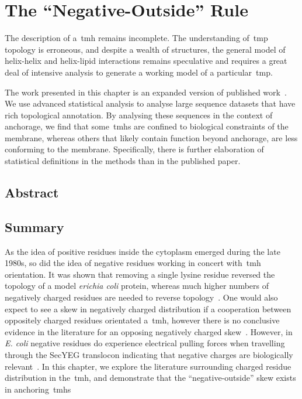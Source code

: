 
\chapter{The ``Negative-Outside'' Rule}
\sloppy
The description of a~\gls{tmh} remains incomplete.
The understanding of~\gls{tmp} topology is erroneous, and despite a wealth of structures, the general model of helix-helix and helix-lipid interactions remains speculative and requires a great deal of intensive analysis to generate a working model of a particular~\gls{tmp}.

The work presented in this chapter is an expanded version of published work~\cite{Baker2017}.
We use advanced statistical analysis to analyse large sequence datasets that have rich topological annotation.
By analysing these sequences in the context of anchorage, we find that some~\gls{tmh}s are confined to biological constraints of the membrane, whereas others that likely contain function beyond anchorage, are less conforming to the membrane.
Specifically, there is further elaboration of statistical definitions in the methods than in the published paper.

\section{Abstract}

\section{Summary}
As the idea of positive residues inside the cytoplasm emerged during the late 1980s, so did the idea of negative residues working in concert with~\gls{tmh} orientation.
It was shown that removing a single lysine residue reversed the topology of a model \textit{erichia coli} protein, whereas much higher numbers of negatively charged residues are needed to reverse topology~\cite{Nilsson1990}.
One would also expect to see a skew in negatively charged distribution if a cooperation between oppositely charged residues orientated a~\gls{tmh}, however there is no conclusive evidence in the literature for an opposing negatively charged skew~\cite{Granseth2005, Nilsson2005a, Sharpe2010, Baeza-Delgado2013, Pogozheva2013}.
However, in \textit{E.
coli} negative residues do experience electrical pulling forces when travelling through the SecYEG translocon indicating that negative charges are biologically relevant~\cite{Ismail2015}.
In this chapter, we explore the literature surrounding charged residue distribution in the~\gls{tmh}, and demonstrate that the ``negative-outside'' skew exists in anchoring~\gls{tmh}s

